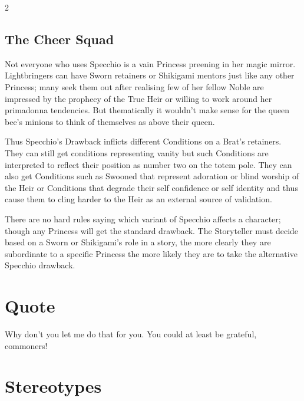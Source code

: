 \begin{multicols}{2}
\begin{mybox}

\section*{The Cheer Squad}

Not everyone who uses Specchio is a vain Princess preening in her magic mirror. Lightbringers can have Sworn retainers or Shikigami mentors just like any other Princess; many seek them out after realising few of her fellow Noble are impressed by the prophecy of the True Heir or willing to work around her primadonna tendencies. But thematically it wouldn't make sense for the queen bee's minions to think of themselves as above their queen. 

Thus Specchio's Drawback inflicts different Conditions on a Brat's retainers. They can still get conditions representing vanity but such Conditions are interpreted to reflect their position as number two on the totem pole. They can also get Conditions such as Swooned that represent adoration or blind worship of the Heir or Conditions that degrade their self confidence or self identity and thus cause them to cling harder to the Heir as an external source of validation. 

There are no hard rules saying which variant of Specchio affects a character; though any Princess will get the standard drawback. The Storyteller must decide based on a Sworn or Shikigami's role in a story, the more clearly they are subordinate to a specific Princess the more likely they are to take the alternative Specchio drawback. 

\end{mybox}


\section*{Quote}

Why don't you let me do that for you. You could at least be grateful, commoners! 


\section*{Stereotypes}


\end{multicols}

